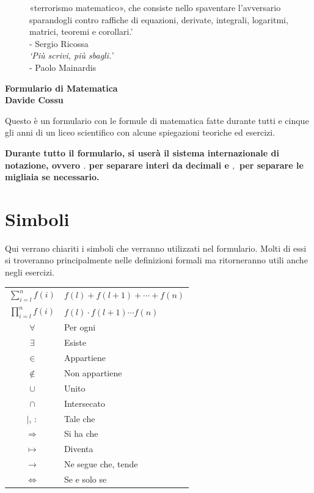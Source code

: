 \documentclass[8pt, a4paper, twocolumn]{extarticle}
\begin{document}
\begin{@twocolumnfalse}
\begin{center}
\begin{figure}[!h]
{{                           «terrorismo matematico», che consiste nello spaventare l'avversario 
                          sparandogli contro raffiche di equazioni, derivate, integrali, logaritmi,
                          matrici, teoremi e corollari.'}\\- Sergio Ricossa\\ [\baselineskip]
                          \textit{`Più scrivi, più sbagli.'}\\- Paolo Mainardis}
			\label{fig:octopus}
		\end{figure}
		\vspace{1cm}
		\begin{minipage}{.6\textwidth}				
			\begin{center}
				{\Huge\textbf{Formulario di Matematica}}\\\vspace{0.2cm}
				{\textbf{Davide Cossu}}
			\end{center}
			\vspace{0.5cm}
			Questo è un formulario con le formule di matematica fatte durante tutti e cinque gli anni 
			di un liceo scientifico con alcune spiegazioni teoriche ed esercizi.
		\end{minipage}
	\end{center}
	\clearpage
\end{@twocolumnfalse}

\twocolumn
{
	\hypersetup{linkcolor=black}
	\tableofcontents
}

\newpage
\textbf{Durante tutto il formulario, si userà il sistema internazionale di notazione, ovvero $.$ per 
separare interi da decimali e $,$ per separare le migliaia se necessario.}
\section{Simboli}
Qui verrano chiariti i simboli che verranno utilizzati nel formulario. Molti di essi si troveranno
principalmente nelle definizioni formali ma ritorneranno utili anche negli esercizi.

\begin{tabular}{c | M{6cm}}
	$\sum\limits_{i = l}^{n} f(i)$ & $f(l) + f(l+1) + \dotsb + f(n)$\\
	$\prod\limits_{i = l}^{n} f(i)$ & $f(l) \cdot f(l+1) \dotsm f(n)$\\
	$\forall$ & Per ogni\\
	$\exists$ & Esiste\\
	$\in$ & Appartiene\\
	$\not\in$ & Non appartiene\\
	$\cup$ & Unito\\
	$\cap$ & Intersecato\\
	$\mid$, $:$ & Tale che\\
	$\Rightarrow$ & Si ha che\\
	$\mapsto$ & Diventa\\
	$\rightarrow$ & Ne segue che, tende\\
	$\iff$ & Se e solo se
\end{tabular}
\end{document}
